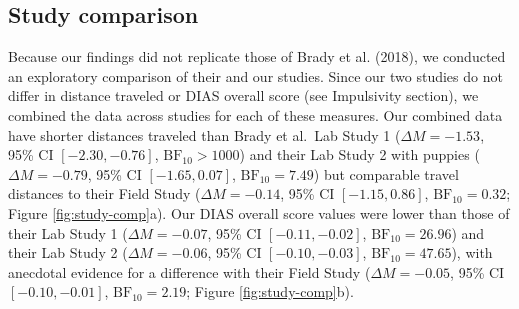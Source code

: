 \documentclass[
  pub,floatsintext]{apa6}
\begin{document}
\hypertarget{study-comparison}{%
\subsection{Study comparison}\label{study-comparison}}

Because our findings did not replicate those of Brady et al. (2018), we conducted an exploratory comparison of their and our studies. Since our two studies do not differ in distance traveled or DIAS overall score (see Impulsivity section), we combined the data across studies for each of these measures. Our combined data have shorter distances traveled than Brady et al.~Lab Study 1 (\(\Delta M = -1.53\), 95\% CI \([-2.30, -0.76]\), \(\mathrm{BF}_{\textrm{10}} > 1000\)) and their Lab Study 2 with puppies (\(\Delta M = -0.79\), 95\% CI \([-1.65, 0.07]\), \(\mathrm{BF}_{\textrm{10}} = 7.49\)) but comparable travel distances to their Field Study (\(\Delta M = -0.14\), 95\% CI \([-1.15, 0.86]\), \(\mathrm{BF}_{\textrm{10}} = 0.32\); Figure \ref{fig:study-comp}a). Our DIAS overall score values were lower than those of their Lab Study 1 (\(\Delta M = -0.07\), 95\% CI \([-0.11, -0.02]\), \(\mathrm{BF}_{\textrm{10}} = 26.96\)) and their Lab Study 2 (\(\Delta M = -0.06\), 95\% CI \([-0.10, -0.03]\), \(\mathrm{BF}_{\textrm{10}} = 47.65\)), with anecdotal evidence for a difference with their Field Study (\(\Delta M = -0.05\), 95\% CI \([-0.10, -0.01]\), \(\mathrm{BF}_{\textrm{10}} = 2.19\); Figure \ref{fig:study-comp}b).
\end{document}
